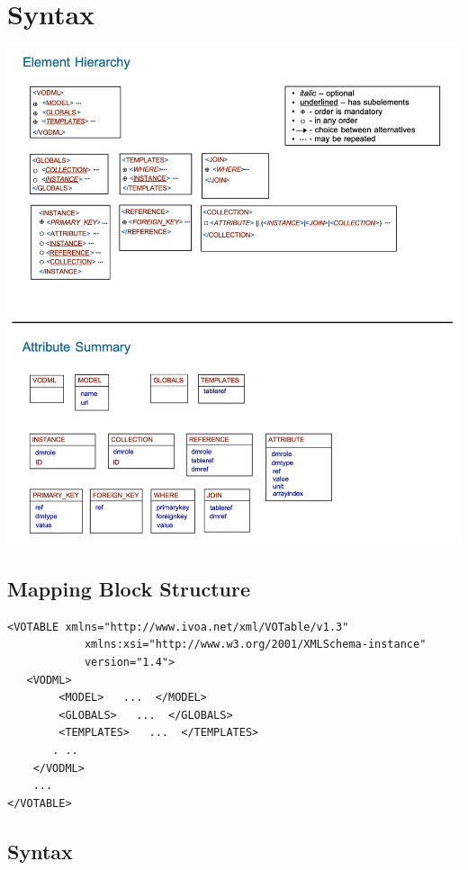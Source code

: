 \documentclass[11pt,a4paper]{ivoa}
\begin{document}
\section{Syntax}
\includegraphics[width=\textwidth]{merged-syntax-summary.png}

\subsection{Mapping Block Structure}

\begin{lstlisting}[caption={Complete mapping block example},style=XML,basicstyle=\tiny]
<VOTABLE xmlns="http://www.ivoa.net/xml/VOTable/v1.3" 
            xmlns:xsi="http://www.w3.org/2001/XMLSchema-instance" 
            version="1.4">
   <VODML>
        <MODEL>   ...  </MODEL>
        <GLOBALS>   ...  </GLOBALS>
        <TEMPLATES>   ...  </TEMPLATES>
       . ..
    </VODML>
    ...
</VOTABLE>
\end{lstlisting}


\subsection{Syntax}
\end{document}
